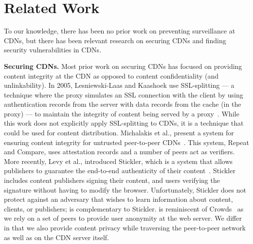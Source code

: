 \section{Related Work}
\label{sec:related}

To our knowledge, there has been no prior work on preventing surveillance at CDNs, but there 
has been relevant research on securing CDNs and finding security vulnerabilities in CDNs.

 
\textbf{Securing CDNs.} Most prior work on securing CDNs has focused on providing content 
integrity at the CDN as opposed to content confidentiality (and unlinkability).  In 2005, 
Lesniewski-Laas and Kaashoek use SSL-splitting --- a technique 
where the proxy simulates an SSL connection with the client by using authentication records from 
the server with data records from the cache (in the proxy) --- to maintain the 
integrity of content being served by a proxy~\cite{lesniewski2005ssl}.  While this work does not 
explicitly apply SSL-splitting to CDNs, it is a technique that could be used for content 
distribution.  Michalakis et al., present a system for ensuring content integrity for untrusted 
peer-to-peer CDNs~\cite{michalakis2007ensuring}.  This system, Repeat and 
Compare, uses attestation records and a number of peers act as verifiers.  More recently, Levy et al., 
introduced Stickler, which is a system that allows publishers to guarantee the end-to-end 
authenticity of their content~\cite{levy2015stickler}.  Stickler includes content publishers 
signing their content, and users verifying the signature without having to modify the browser.  Unfortunately, 
Stickler does not protect against an adversary that wishes to learn information
about content, clients, 
or publishers; \system{} is complementary to Stickler. \system{} is reminiscent of Crowds~\cite{Reiter:1999:AWT:293411.293778} 
as we rely on a set of peers to provide user anonymity at the web server. We differ in that we 
also provide content privacy while traversing the peer-to-peer network as well as on the CDN server itself. 


